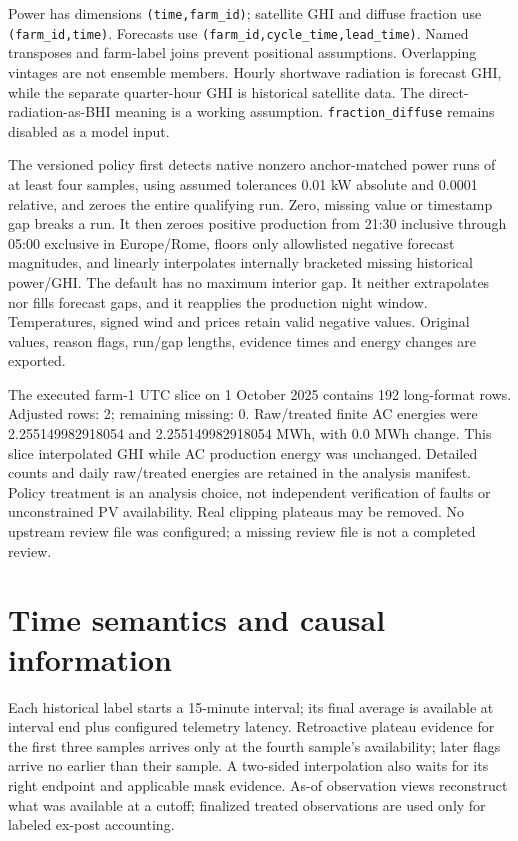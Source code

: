 \documentclass[11pt,a4paper]{article}
\begin{document}
Power has dimensions \texttt{(time,farm\_id)}; satellite GHI and diffuse fraction
use \texttt{(farm\_id,time)}. Forecasts use
\texttt{(farm\_id,cycle\_time,lead\_time)}. Named transposes and farm-label joins
prevent positional assumptions. Overlapping vintages are not ensemble members.
Hourly shortwave radiation is forecast GHI, while the separate quarter-hour GHI
is historical satellite data. The direct-radiation-as-BHI meaning is a working
assumption. \texttt{fraction\_diffuse} remains disabled as a model input.

The versioned policy first detects native nonzero anchor-matched power runs of
at least four samples, using assumed tolerances 0.01 kW absolute and 0.0001
relative, and zeroes the entire qualifying run. Zero, missing value or timestamp
gap breaks a run. It then zeroes positive production from 21:30 inclusive through
05:00 exclusive in Europe/Rome, floors only allowlisted negative forecast
magnitudes, and linearly interpolates internally bracketed missing historical
power/GHI. The default has no maximum interior gap. It neither extrapolates nor
fills forecast gaps, and it reapplies the production night window. Temperatures,
signed wind and prices retain valid negative values. Original values, reason
flags, run/gap lengths, evidence times and energy changes are exported.

The executed farm-1 UTC slice on 1 October 2025 contains 192
long-format rows. Adjusted rows: 2;
remaining missing: 0.
Raw/treated finite AC energies were 2.255149982918054 and
2.255149982918054 MWh, with
0.0 MWh change.
This slice interpolated GHI while AC production energy was unchanged. Detailed
counts and daily raw/treated energies are retained in the analysis manifest.
Policy treatment is an analysis choice, not independent verification of faults or
unconstrained PV availability. Real clipping plateaus may be removed. No upstream
review file was configured; a missing review file is not a completed review.

\section{Time semantics and causal information}
Each historical label starts a 15-minute interval; its final average is available
at interval end plus configured telemetry latency. Retroactive plateau evidence
for the first three samples arrives only at the fourth sample's availability;
later flags arrive no earlier than their sample. A two-sided interpolation also
waits for its right endpoint and applicable mask evidence. As-of observation
views reconstruct what was available at a cutoff; finalized treated observations
are used only for labeled ex-post accounting.
\end{document}
